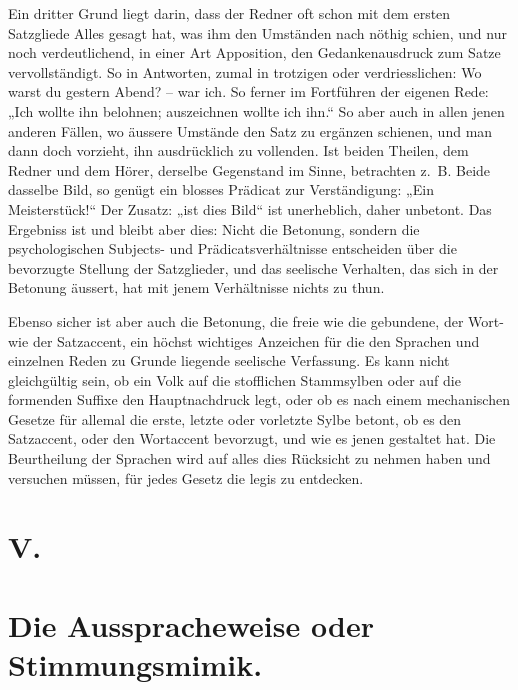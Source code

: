 Ein dritter Grund liegt darin, dass der Redner oft schon mit dem \label{fp.360} ersten Satzgliede Alles gesagt hat, was ihm den Umständen nach nöthig schien, und nur noch verdeutlichend, in einer Art Apposition, den Gedankenausdruck zum Satze vervollständigt. So in Antworten, zumal in trotzigen oder verdriesslichen: Wo warst du gestern Abend? –  war ich. So ferner im Fortführen der eigenen Rede: „Ich wollte ihn belohnen; auszeichnen wollte ich ihn.“ So aber auch in allen jenen anderen Fällen, wo äussere Umstände den Satz zu er\label{sp.376}gänzen schienen, und man dann doch vorzieht, ihn ausdrücklich zu vollenden. Ist beiden Theilen, dem Redner und dem Hörer, derselbe Gegenstand im Sinne, betrachten z.~B. Beide dasselbe Bild, so genügt ein blosses Prädicat zur Verständigung: „Ein Meisterstück!“ Der Zusatz: „ist dies Bild“ ist unerheblich, daher unbetont. Das Ergebniss ist und bleibt aber dies: Nicht die Betonung, sondern die psychologischen Subjects- und Prädicatsverhältnisse entscheiden über die bevorzugte Stellung der Satzglieder, und das seelische Verhalten, das sich in der Betonung äussert, hat mit jenem Verhältnisse nichts zu thun.

Ebenso sicher ist aber auch die Betonung, die freie wie die gebundene, der Wort- wie der Satzaccent, ein höchst wichtiges Anzeichen für die den Sprachen und  einzelnen Reden zu Grunde liegende seelische Verfassung. Es kann nicht gleichgültig sein, ob ein Volk auf die stofflichen Stammsylben oder auf die formenden Suffixe den Hauptnachdruck legt, oder ob es nach einem mechanischen Gesetze  für allemal die erste, letzte oder vorletzte Sylbe betont, ob es den Satzaccent, oder den Wortaccent bevorzugt, und wie es jenen gestaltet hat. Die Beurtheilung der Sprachen wird auf alles dies Rücksicht zu nehmen haben und versuchen müssen, für jedes Gesetz die  legis zu entdecken.

\section*{V.}\label{IV.III.V}
\section*{Die Ausspracheweise oder Stimmungsmimik.}

